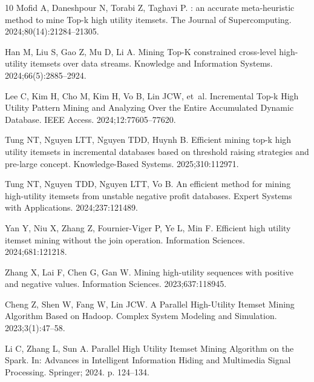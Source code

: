 \documentclass[pdflatex,sn-vancouver-num]{sn-jnl}
\theoremstyle{thmstyleone}%
\theoremstyle{thmstyletwo}%
\theoremstyle{thmstylethree}%
\begin{document}
\begin{thebibliography}{10}
Mofid A, Daneshpour N, Torabi Z, Taghavi P.
: an accurate meta-heuristic method to mine Top-k high
  utility itemsets.
\newblock The Journal of Supercomputing. 2024;80(14):21284--21305.

Han M, Liu S, Gao Z, Mu D, Li A.
\newblock Mining Top-K constrained cross-level high-utility itemsets over data
  streams.
\newblock Knowledge and Information Systems. 2024;66(5):2885--2924.

Lee C, Kim H, Cho M, Kim H, Vo B, Lin JCW, et~al.
\newblock Incremental Top-k High Utility Pattern Mining and Analyzing Over the
  Entire Accumulated Dynamic Database.
\newblock IEEE Access. 2024;12:77605--77620.

Tung NT, Nguyen LTT, Nguyen TDD, Huynh B.
\newblock Efficient mining top-k high utility itemsets in incremental databases
  based on threshold raising strategies and pre-large concept.
\newblock Knowledge-Based Systems. 2025;310:112971.

Tung NT, Nguyen TDD, Nguyen LTT, Vo B.
\newblock An efficient method for mining high-utility itemsets from unstable
  negative profit databases.
\newblock Expert Systems with Applications. 2024;237:121489.

Yan Y, Niu X, Zhang Z, Fournier-Viger P, Ye L, Min F.
\newblock Efficient high utility itemset mining without the join operation.
\newblock Information Sciences. 2024;681:121218.

Zhang X, Lai F, Chen G, Gan W.
\newblock Mining high-utility sequences with positive and negative values.
\newblock Information Sciences. 2023;637:118945.

Cheng Z, Shen W, Fang W, Lin JCW.
\newblock A Parallel High-Utility Itemset Mining Algorithm Based on Hadoop.
\newblock Complex System Modeling and Simulation. 2023;3(1):47--58.

Li C, Zhang L, Sun A.
\newblock Parallel High Utility Itemset Mining Algorithm on the Spark.
\newblock In: Advances in Intelligent Information Hiding and Multimedia Signal
  Processing. Springer; 2024. p. 124--134.


\end{thebibliography}
\end{document}
